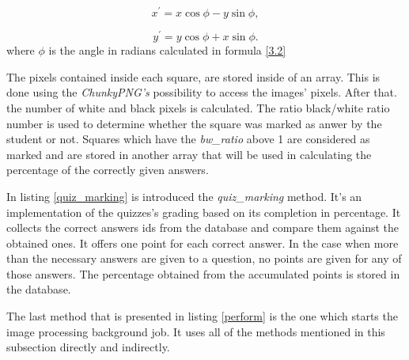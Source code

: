 \begin{equation}
x^{\prime} = x \cos \phi - y \sin \phi, \label{3.4}
\end{equation}

\begin{equation}
y^{\prime} = y \cos \phi + x \sin \phi. \label{3.5}
\end{equation}
where $\phi$ is the angle in radians calculated in formula \ref{3.2}

The pixels contained inside each square, are stored inside of an array. This is done using the \textit{ChunkyPNG's} possibility to access the images' pixels. After that. the number of white and black pixels is calculated. The ratio black/white ratio number is used to determine whether the square was marked as anwer by the student or not. Squares which have the \textit{bw\_ratio} above 1 are considered as marked and are stored in another array that will be used in calculating the percentage of the correctly given answers.



In listing \ref{quiz_marking} is introduced the \textit{quiz\_marking} method. It's an implementation of the quizzes's grading based on its completion in percentage. It collects the correct answers ids from the database and compare them against the obtained ones. It offers one point for each correct answer. In the case when more than the necessary answers are given to a question, no points are given for any of those answers. The percentage obtained from the accumulated points is stored in the database.




\vspace{5pt}
The last method that is presented in listing \ref{perform} is the one which starts the image processing background job. It uses all of the methods mentioned in this subsection directly and indirectly.




\clearpage